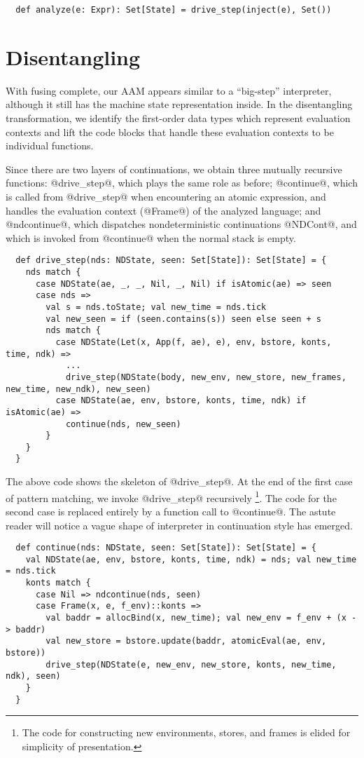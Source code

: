 \documentclass[acmsmall, review]{acmart}\settopmatter{}
\begin{document}
\begin{lstlisting}
  def analyze(e: Expr): Set[State] = drive_step(inject(e), Set())
\end{lstlisting}

\section{Disentangling} \label{disen}

With fusing complete, our AAM
appears similar to a ``big-step'' interpreter, although it still has the machine
state representation inside.
In the disentangling transformation, we
identify the first-order data types which represent evaluation contexts
and lift the code blocks that handle these evaluation contexts to be individual functions.

Since there are two layers of continuations,
we obtain three mutually recursive functions: @drive_step@, which plays the same
role as before; @continue@, which is called from @drive_step@ when encountering an atomic 
expression, and handles the evaluation context (@Frame@) of the analyzed
language; and @ndcontinue@, which dispatches nondeterministic continuations @NDCont@,
and which is invoked from @continue@ when the normal stack is empty.

\begin{lstlisting}
  def drive_step(nds: NDState, seen: Set[State]): Set[State] = {
    nds match {
      case NDState(ae, _, _, Nil, _, Nil) if isAtomic(ae) => seen
      case nds =>
        val s = nds.toState; val new_time = nds.tick
        val new_seen = if (seen.contains(s)) seen else seen + s
        nds match {
          case NDState(Let(x, App(f, ae), e), env, bstore, konts, time, ndk) =>
            ...
            drive_step(NDState(body, new_env, new_store, new_frames, new_time, new_ndk), new_seen)
          case NDState(ae, env, bstore, konts, time, ndk) if isAtomic(ae) =>
            continue(nds, new_seen)
        }
    }
  }
\end{lstlisting}

The above code shows the skeleton of @drive_step@.
At the end of the first case of pattern matching, we invoke @drive_step@ recursively 
\footnote{The code for constructing new environments, stores, and frames is elided for 
simplicity of presentation.}.
The code for the second case is replaced entirely by a function call to @continue@.
The astute reader will notice a vague shape of interpreter in continuation style has emerged.

\begin{lstlisting}
  def continue(nds: NDState, seen: Set[State]): Set[State] = {
    val NDState(ae, env, bstore, konts, time, ndk) = nds; val new_time = nds.tick
    konts match {
      case Nil => ndcontinue(nds, seen)
      case Frame(x, e, f_env)::konts =>
        val baddr = allocBind(x, new_time); val new_env = f_env + (x -> baddr)
        val new_store = bstore.update(baddr, atomicEval(ae, env, bstore))
        drive_step(NDState(e, new_env, new_store, konts, new_time, ndk), seen)
    }
  }
\end{lstlisting}
\end{document}
